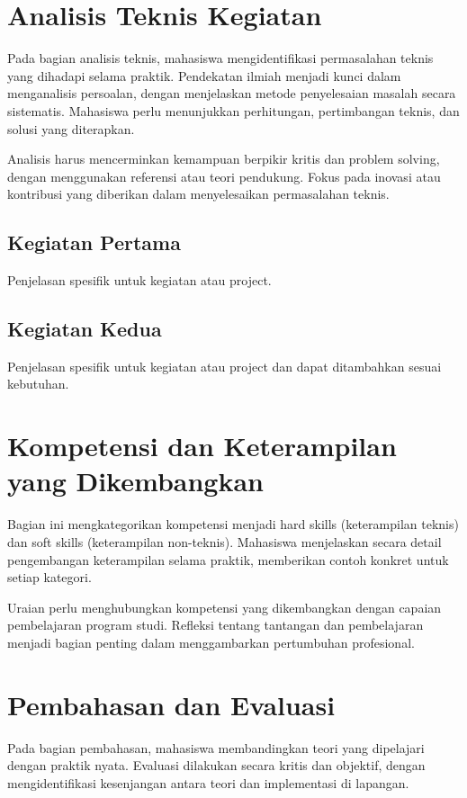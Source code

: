 \section{Analisis Teknis Kegiatan}
Pada bagian analisis teknis, mahasiswa mengidentifikasi permasalahan teknis yang dihadapi selama praktik. Pendekatan ilmiah menjadi kunci dalam menganalisis persoalan, dengan menjelaskan metode penyelesaian masalah secara sistematis. Mahasiswa perlu menunjukkan perhitungan, pertimbangan teknis, dan solusi yang diterapkan.

Analisis harus mencerminkan kemampuan berpikir kritis dan problem solving, dengan menggunakan referensi atau teori pendukung. Fokus pada inovasi atau kontribusi yang diberikan dalam menyelesaikan permasalahan teknis.

\subsection{Kegiatan Pertama}
Penjelasan spesifik untuk kegiatan atau project.

\subsection{Kegiatan Kedua}
Penjelasan spesifik untuk kegiatan atau project dan dapat ditambahkan sesuai kebutuhan.

\section{Kompetensi dan Keterampilan yang Dikembangkan}
Bagian ini mengkategorikan kompetensi menjadi hard skills (keterampilan teknis) dan soft skills (keterampilan non-teknis). Mahasiswa menjelaskan secara detail pengembangan keterampilan selama praktik, memberikan contoh konkret untuk setiap kategori.

Uraian perlu menghubungkan kompetensi yang dikembangkan dengan capaian pembelajaran program studi. Refleksi tentang tantangan dan pembelajaran menjadi bagian penting dalam menggambarkan pertumbuhan profesional.

\section{Pembahasan dan Evaluasi}
Pada bagian pembahasan, mahasiswa membandingkan teori yang dipelajari dengan praktik nyata. Evaluasi dilakukan secara kritis dan objektif, dengan mengidentifikasi kesenjangan antara teori dan implementasi di lapangan. 

